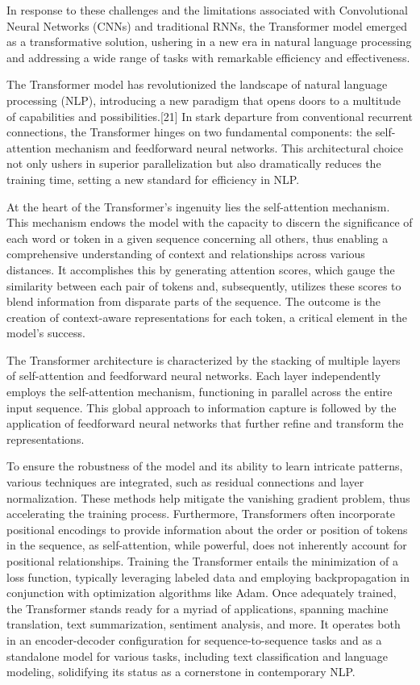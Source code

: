 \documentclass[conference]{IEEEtran}
\begin{document}
In response to these challenges and the limitations associated with Convolutional Neural Networks (CNNs) and traditional RNNs, the Transformer model emerged as a transformative solution, ushering in a new era in natural language processing and addressing a wide range of tasks with remarkable efficiency and effectiveness.

The Transformer model has revolutionized the landscape of natural language processing (NLP), introducing a new paradigm that opens doors to a multitude of capabilities and possibilities.[21] In stark departure from conventional recurrent connections, the Transformer hinges on two fundamental components: the self-attention mechanism and feedforward neural networks. This architectural choice not only ushers in superior parallelization but also dramatically reduces the training time, setting a new standard for efficiency in NLP.


At the heart of the Transformer's ingenuity lies the self-attention mechanism. This mechanism endows the model with the capacity to discern the significance of each word or token in a given sequence concerning all others, thus enabling a comprehensive understanding of context and relationships across various distances. It accomplishes this by generating attention scores, which gauge the similarity between each pair of tokens and, subsequently, utilizes these scores to blend information from disparate parts of the sequence. The outcome is the creation of context-aware representations for each token, a critical element in the model's success.


The Transformer architecture is characterized by the stacking of multiple layers of self-attention and feedforward neural networks. Each layer independently employs the self-attention mechanism, functioning in parallel across the entire input sequence. This global approach to information capture is followed by the application of feedforward neural networks that further refine and transform the representations.


To ensure the robustness of the model and its ability to learn intricate patterns, various techniques are integrated, such as residual connections and layer normalization. These methods help mitigate the vanishing gradient problem, thus accelerating the training process. Furthermore, Transformers often incorporate positional encodings to provide information about the order or position of tokens in the sequence, as self-attention, while powerful, does not inherently account for positional relationships.
Training the Transformer entails the minimization of a loss function, typically leveraging labeled data and employing backpropagation in conjunction with optimization algorithms like Adam. Once adequately trained, the Transformer stands ready for a myriad of applications, spanning machine translation, text summarization, sentiment analysis, and more. It operates both in an encoder-decoder configuration for sequence-to-sequence tasks and as a standalone model for various tasks, including text classification and language modeling, solidifying its status as a cornerstone in contemporary NLP.
\end{document}
